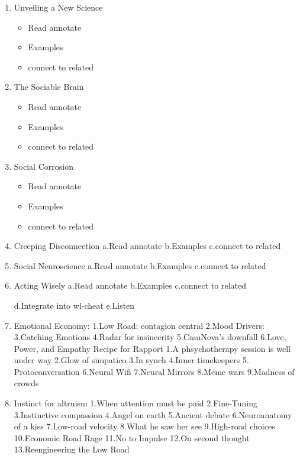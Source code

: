 \documentclass[11pt]{article}
\begin{document}
\begin{enumerate} 
\tiny \item \tiny Unveiling a New Science 
\begin{itemize} 
\tiny \item \tiny Read annotate
\item \tiny Examples
\item \tiny connect to related
\end{itemize}

\tiny \item \tiny The Sociable Brain 

\begin{itemize} 
\tiny \item \tiny Read annotate
\item \tiny Examples
\item \tiny connect to related 
\end{itemize} 

\item \tiny Social Corrosion
\begin{itemize} 
\item \tiny Read annotate
\item \tiny Examples
\item \tiny connect to related
\end{itemize} 

\item \tiny Creeping Disconnection
a.Read annotate
b.Examples
c.connect to related

\item \tiny Social Neuroscience
a.Read annotate
b.Examples
c.connect to related

\item \tiny Acting Wisely
a.Read annotate
b.Examples
c.connect to related

d.Integrate into wl-cheat
e.Listen 

\item \tiny Emotional Economy: 
1.Low Road: contagion central 
2.Mood Drivers: 
3.Catching Emotions 
4.Radar for insincerity 
5.CasaNova’s downfall 
6.Love, Power, and Empathy 
Recipe for Rapport 
1.A phsychotherapy session is well under way
2.Glow of simpatico 
3.In synch 
4.Inner timekeepers
5. Protoconversation 
6.Neural Wifi 
7.Neural Mirrors
8.Meme wars 
9.Madness of crowds 

\item \tiny Instinct for altruism 
1.When attention must be paid 
2.Fine-Tuning 
3.Instinctive compassion 
4.Angel on earth 
5.Ancient debate 
6.Neuroanatomy of a kiss 
7.Low-road velocity 
8.What he saw her see 
9.High-road choices 
10.Economic Road Rage 
11.No to Impulse 
12.On second thought
13.Reengineering the Low Road


\end{enumerate}
\end{document}
